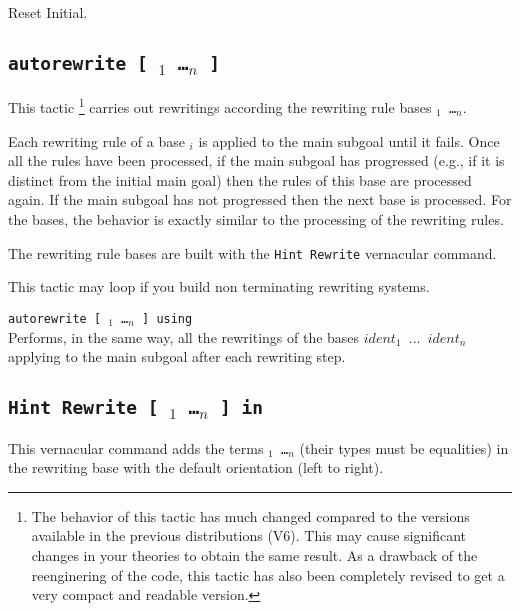 \begin{coq_eval}
Reset Initial.
\end{coq_eval}

\subsection{\tt autorewrite  [ \ident$_1$ \dots \ident$_n$ ]}

This tactic \footnote{The behavior of this tactic has much changed compared to
the versions available in the previous distributions (V6). This may cause
significant changes in your theories to obtain the same result. As a drawback
of the reenginering of the code, this tactic has also been completely revised
to get a very compact and readable version.} carries out rewritings according
the rewriting rule bases {\tt \ident$_1$ \dots \ident$_n$}.

 Each rewriting rule of a base \ident$_i$ is applied to the main subgoal until
it fails. Once all the rules have been processed, if the main subgoal has
progressed (e.g., if it is distinct from the initial main goal) then the rules
of this base are processed again. If the main subgoal has not progressed then
the next base is processed. For the bases, the behavior is exactly similar to
the processing of the rewriting rules.

The rewriting rule bases are built with the {\tt Hint~Rewrite} vernacular
command.

\Warning{} This tactic may loop if you build non terminating rewriting systems.

\begin{Variant}
\item {\tt autorewrite  [ \ident$_1$ \dots \ident$_n$ ] using \tac}\\
Performs, in the same way, all the rewritings of the bases {\tt $ident_1$ $...$
$ident_n$} applying {\tt \tac} to the main subgoal after each rewriting step.
\end{Variant}

\subsection{\tt Hint Rewrite [ \term$_1$ \dots \term$_n$ ] in \ident}

This vernacular command adds the terms {\tt \term$_1$ \dots \term$_n$} (their
types must be equalities) in the rewriting base {\tt \ident} with the default
orientation (left to right).

